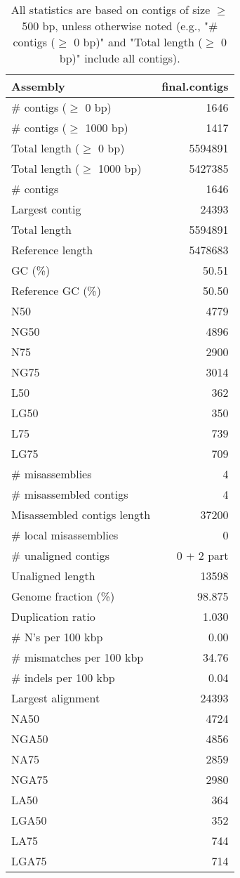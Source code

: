 \documentclass[12pt,a4paper]{article}
\begin{document}
\begin{table}[ht]
\begin{center}
\caption{All statistics are based on contigs of size $\geq$ 500 bp, unless otherwise noted (e.g., "\# contigs ($\geq$ 0 bp)" and "Total length ($\geq$ 0 bp)" include all contigs).}
\begin{tabular}{|l*{1}{|r}|}
\hline
Assembly & final.contigs \\ \hline
\# contigs ($\geq$ 0 bp) & 1646 \\ \hline
\# contigs ($\geq$ 1000 bp) & 1417 \\ \hline
Total length ($\geq$ 0 bp) & 5594891 \\ \hline
Total length ($\geq$ 1000 bp) & 5427385 \\ \hline
\# contigs & 1646 \\ \hline
Largest contig & 24393 \\ \hline
Total length & 5594891 \\ \hline
Reference length & 5478683 \\ \hline
GC (\%) & 50.51 \\ \hline
Reference GC (\%) & 50.50 \\ \hline
N50 & 4779 \\ \hline
NG50 & 4896 \\ \hline
N75 & 2900 \\ \hline
NG75 & 3014 \\ \hline
L50 & 362 \\ \hline
LG50 & 350 \\ \hline
L75 & 739 \\ \hline
LG75 & 709 \\ \hline
\# misassemblies & 4 \\ \hline
\# misassembled contigs & 4 \\ \hline
Misassembled contigs length & 37200 \\ \hline
\# local misassemblies & 0 \\ \hline
\# unaligned contigs & 0 + 2 part \\ \hline
Unaligned length & 13598 \\ \hline
Genome fraction (\%) & 98.875 \\ \hline
Duplication ratio & 1.030 \\ \hline
\# N's per 100 kbp & 0.00 \\ \hline
\# mismatches per 100 kbp & 34.76 \\ \hline
\# indels per 100 kbp & 0.04 \\ \hline
Largest alignment & 24393 \\ \hline
NA50 & 4724 \\ \hline
NGA50 & 4856 \\ \hline
NA75 & 2859 \\ \hline
NGA75 & 2980 \\ \hline
LA50 & 364 \\ \hline
LGA50 & 352 \\ \hline
LA75 & 744 \\ \hline
LGA75 & 714 \\ \hline
\end{tabular}
\end{center}
\end{table}
\end{document}
